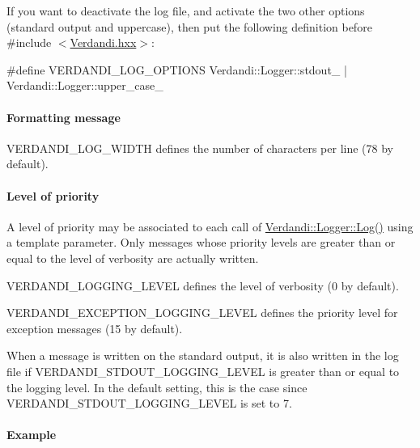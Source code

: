 \documentclass{tufte-book}
\begin{document}
\-If you want to deactivate the log file, and activate the two other options (standard output and uppercase), then put the following definition before {\ttfamily \#include $<$\hyperlink{_verdandi_8hxx_source}{\-Verdandi.\-hxx}$>$}\-:

 \begin{frame_cpp}
#define VERDANDI_LOG_OPTIONS Verdandi::Logger::stdout_ | Verdandi::Logger::upper_case_
\end{frame_cpp}

 \hypertarget{debugging_formatting_messages}{}\paragraph{\-Formatting message}\label{debugging_formatting_messages}

{\ttfamily \-V\-E\-R\-D\-A\-N\-D\-I\-\_\-\-L\-O\-G\-\_\-\-W\-I\-D\-T\-H} defines the number of characters per line (78 by default).

\hypertarget{debugging_level_of_priority}{}\paragraph{\-Level of priority}\label{debugging_level_of_priority}
\-A level of priority may be associated to each call of {\ttfamily  \hyperlink{class_verdandi_1_1_logger_ab49f0d118882a7e67bb2e58239b5fafd}{\-Verdandi\-::\-Logger\-::\-Log()}} using a template parameter. \-Only messages whose priority levels are greater than or equal to the level of verbosity are actually written.

{\ttfamily \-V\-E\-R\-D\-A\-N\-D\-I\-\_\-\-L\-O\-G\-G\-I\-N\-G\-\_\-\-L\-E\-V\-E\-L} defines the level of verbosity (0 by default).

{\ttfamily \-V\-E\-R\-D\-A\-N\-D\-I\-\_\-\-E\-X\-C\-E\-P\-T\-I\-O\-N\-\_\-\-L\-O\-G\-G\-I\-N\-G\-\_\-\-L\-E\-V\-E\-L} defines the priority level for exception messages (15 by default).

\-When a message is written on the standard output, it is also written in the log file if {\ttfamily \-V\-E\-R\-D\-A\-N\-D\-I\-\_\-\-S\-T\-D\-O\-U\-T\-\_\-\-L\-O\-G\-G\-I\-N\-G\-\_\-\-L\-E\-V\-E\-L} is greater than or equal to the logging level. \-In the default setting, this is the case since {\ttfamily \-V\-E\-R\-D\-A\-N\-D\-I\-\_\-\-S\-T\-D\-O\-U\-T\-\_\-\-L\-O\-G\-G\-I\-N\-G\-\_\-\-L\-E\-V\-E\-L} is set to 7.

\hypertarget{debugging_example}{}\paragraph{\-Example}\label{debugging_example}
\end{document}
